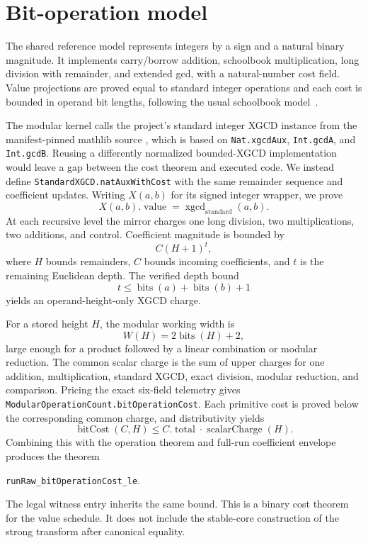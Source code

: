 \documentclass[11pt]{article}
\newcommand{\code}[1]{\texttt{#1}}
\newcommand{\bits}{\operatorname{bits}}
\begin{document}
\section{Bit-operation model}

The shared reference model represents integers by a sign and a natural binary
magnitude.  It implements carry/borrow addition, schoolbook multiplication,
long division with remainder, and extended gcd, with a natural-number cost
field.  Value projections are proved equal to standard integer operations and
each cost is bounded in operand bit lengths, following the usual schoolbook
model~\citep[Chapter 1]{brentZimmermann2010}.

The modular kernel calls the project's standard integer XGCD instance from
the manifest-pinned mathlib source \citep{mathlib4320intGCD}, which
is based on \code{Nat.xgcdAux}, \code{Int.gcdA}, and \code{Int.gcdB}.  Reusing
a differently normalized bounded-XGCD implementation would leave a gap between
the cost theorem and executed code.  We instead define
\code{StandardXGCD.natAuxWithCost} with the same remainder sequence and
coefficient updates. Writing $X(a,b)$ for its signed integer wrapper, we prove
\[
  X(a,b).\operatorname{value}
  =\operatorname{xgcd}_{\mathrm{standard}}(a,b).
\]
At each recursive level the mirror charges one long division, two
multiplications, two additions, and control.  Coefficient magnitude is bounded
by
\[
  C(H+1)^t,
\]
where $H$ bounds remainders, $C$ bounds incoming coefficients, and $t$ is the
remaining Euclidean depth.  The verified depth bound
\[
  t\le\bits(a)+\bits(b)+1
\]
yields an operand-height-only XGCD charge.

For a stored height $H$, the modular working width is
\[
  W(H)=2\bits(H)+2,
\]
large enough for a product followed by a linear combination or modular
reduction.  The common scalar charge is the sum of upper charges for one
addition, multiplication, standard XGCD, exact division, modular reduction,
and comparison.  Pricing the exact six-field telemetry gives
\code{ModularOperationCount.bitOperationCost}.  Each primitive cost is proved
below the corresponding common charge, and distributivity yields
\[
  \operatorname{bitCost}(C,H)
  \le C.\operatorname{total}\cdot\operatorname{scalarCharge}(H).
\]
Combining this with the operation theorem and full-run coefficient envelope
produces the theorem
\begin{center}
\code{runRaw\_bitOperationCost\_le}.
\end{center}
The legal witness entry inherits the same bound.  This is a binary cost theorem for the value schedule. It
does not include the stable-core construction of the strong transform after
canonical equality.
\end{document}
